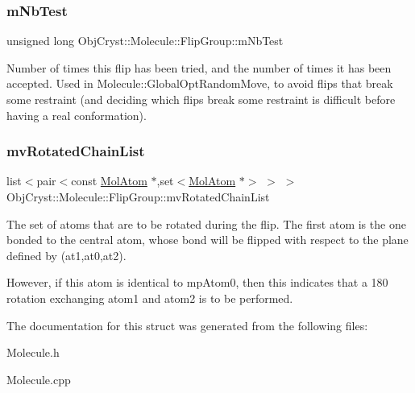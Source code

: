 \subsubsection{\texorpdfstring{mNbTest}{mNbTest}}
{\footnotesize\ttfamily unsigned long Obj\+Cryst\+::\+Molecule\+::\+Flip\+Group\+::m\+Nb\+Test\hspace{0.3cm}{\ttfamily [mutable]}}

Number of times this flip has been tried, and the number of times it has been accepted. Used in Molecule\+::\+Global\+Opt\+Random\+Move, to avoid flips that break some restraint (and deciding which flips break some restraint is difficult before having a real conformation). \mbox{\label{struct_obj_cryst_1_1_molecule_1_1_flip_group_a30d77e3abea9f1bb27ffcd92dc1120cc}} 
\subsubsection{\texorpdfstring{mvRotatedChainList}{mvRotatedChainList}}
{\footnotesize\ttfamily list$<$pair$<$const \mbox{\hyperlink{class_obj_cryst_1_1_mol_atom}{Mol\+Atom}} $\ast$,set$<$\mbox{\hyperlink{class_obj_cryst_1_1_mol_atom}{Mol\+Atom}} $\ast$$>$ $>$ $>$ Obj\+Cryst\+::\+Molecule\+::\+Flip\+Group\+::mv\+Rotated\+Chain\+List}

The set of atoms that are to be rotated during the flip. The first atom is the one bonded to the central atom, whose bond will be flipped with respect to the plane defined by (at1,at0,at2).

However, if this atom is identical to mp\+Atom0, then this indicates that a 180{\ucr} rotation exchanging atom1 and atom2 is to be performed. 

The documentation for this struct was generated from the following files\+:\begin{DoxyCompactItemize}
\item 
Molecule.\+h\item 
Molecule.\+cpp\end{DoxyCompactItemize}
